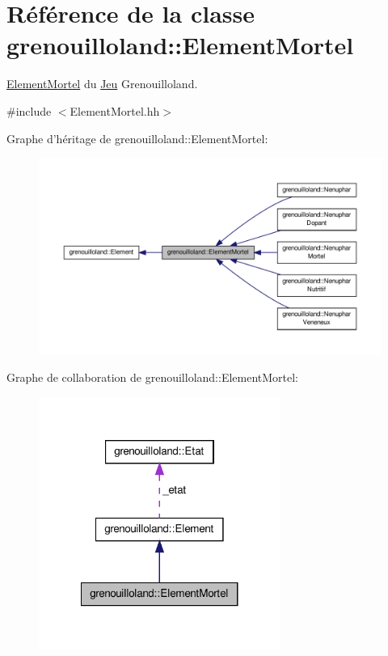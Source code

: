 \hypertarget{classgrenouilloland_1_1ElementMortel}{\section{Référence de la classe grenouilloland\-:\-:Element\-Mortel}
\label{classgrenouilloland_1_1ElementMortel}
}


\hyperlink{classgrenouilloland_1_1ElementMortel}{Element\-Mortel} du \hyperlink{classgrenouilloland_1_1Jeu}{Jeu} Grenouilloland.  




{\ttfamily \#include $<$Element\-Mortel.\-hh$>$}



Graphe d'héritage de grenouilloland\-:\-:Element\-Mortel\-:
\nopagebreak
\begin{figure}[H]
\begin{center}
\leavevmode
\includegraphics[width=350pt]{classgrenouilloland_1_1ElementMortel__inherit__graph}
\end{center}
\end{figure}


Graphe de collaboration de grenouilloland\-:\-:Element\-Mortel\-:
\nopagebreak
\begin{figure}[H]
\begin{center}
\leavevmode
\includegraphics[width=224pt]{classgrenouilloland_1_1ElementMortel__coll__graph}
\end{center}
\end{figure}
